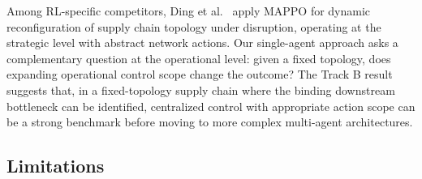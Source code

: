 Among RL-specific competitors, Ding et al.~\cite{ding2026} apply MAPPO for dynamic
reconfiguration of supply chain topology under disruption, operating at the
strategic level with abstract network actions. Our single-agent approach
asks a complementary question at the operational level: given a fixed
topology, does expanding operational control scope change the outcome? The
Track B result suggests that, in a fixed-topology supply chain where the
binding downstream bottleneck can be identified, centralized control with
appropriate action scope can be a strong benchmark before moving to more
complex multi-agent architectures.

\hypertarget{55-limitations}{%
\subsection{Limitations}\label{55-limitations}}

